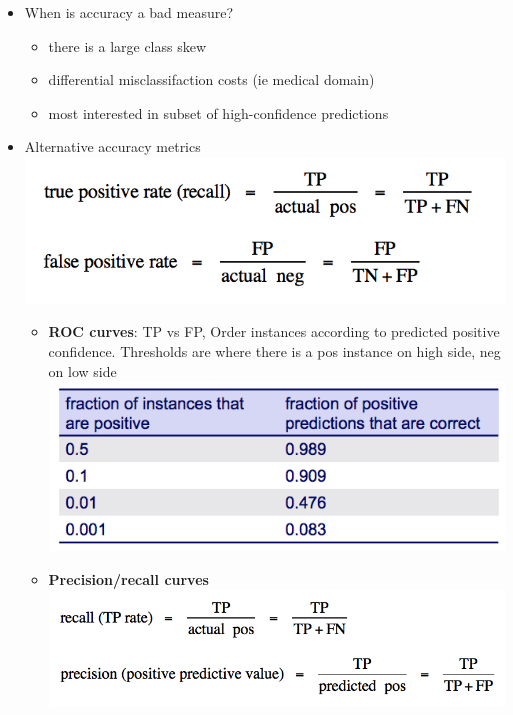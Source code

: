 \documentclass[a4paper]{article}
\begin{document}
\begin{itemize}
\item When is accuracy a bad measure?
  \begin{itemize}
  \item there is a large class skew
  \item differential misclassifaction costs (ie medical domain)
  \item most interested in subset of high-confidence predictions
  \end{itemize}

\item Alternative accuracy metrics \\
  \includegraphics{tpfp}
  \begin{itemize}
  \item \textbf{ROC curves}: TP vs FP, Order instances according to predicted
    positive confidence. Thresholds are where there is a pos instance
    on high side, neg on low side \\
    \includegraphics[scale=0.75]{roc}

  \item \textbf{Precision/recall curves} \\
    \includegraphics{pr}


\end{itemize}
\end{itemize}
\end{document}
